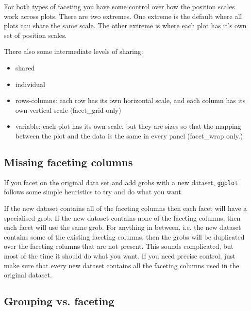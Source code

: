 For both types of faceting you have some control over how the position scales work across plots.  There are two extremes.  One extreme is the default where all plots can share the same scale.  The other extreme is where each plot has it's own set of position scales.  

There also some intermediate levels of sharing:

\begin{itemize}
  \item shared
  \item individual
  \item rows-columns: each row has its own horizontal scale, and each column has its own vertical scale (facet\_grid only)
  \item variable: each plot has its own scale, but they are sizes so that the mapping between the plot and the data is the same in every panel (facet\_wrap only.)
\end{itemize}



\subsection{Missing faceting columns}\label{sub:missing_faceting_columsn}

If you facet on the original data set and add grobs with a new dataset, {\tt ggplot} follows some simple heuristics to try and do what you want.  

If the new dataset contains all of the faceting columns then each facet will have a specialised grob. If the new dataset contains none of the faceting columns, then each facet will use the same grob.  For anything in between, i.e. the new dataset contains some of the existing faceting columns, then the grobs will be duplicated over the faceting columns that are not present.  This sounds complicated, but most of the time it should do what you want.  If you need precise control, just make sure that every new dataset contains all the faceting columns used in the original dataset.



\subsection{Grouping vs. faceting}

